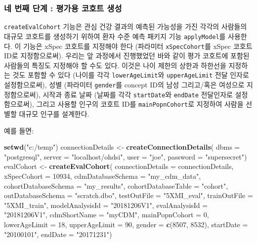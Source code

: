 \documentclass[10.5pt]{book}
\newenvironment{Shaded}{\begin{snugshade}}{\end{snugshade}}
\newcommand{\KeywordTok}[1]{\textcolor[rgb]{0.13,0.29,0.53}{\textbf{#1}}}
\newcommand{\DataTypeTok}[1]{\textcolor[rgb]{0.13,0.29,0.53}{#1}}
\newcommand{\DecValTok}[1]{\textcolor[rgb]{0.00,0.00,0.81}{#1}}
\newcommand{\StringTok}[1]{\textcolor[rgb]{0.31,0.60,0.02}{#1}}
\newcommand{\NormalTok}[1]{#1}
\theoremstyle{definition}
\theoremstyle{definition}
\theoremstyle{definition}
\theoremstyle{remark}
\begin{document}
\subsubsection*{네 번째 단계 : 평가용 코호트 생성}\label{-----}

\texttt{createEvalCohort} 기능은 관심 건강 결과의 예측된 가능성을 가진
각각의 사람들의 대규모 코호트를 생성하기 위하여 환자 수준 예측 패키지
기능 \texttt{applyModel}를 사용한다. 이 기능은 xSpec 코호트를 지정해야
한다 (파라미터 \texttt{xSpecCohort}를 xSpec 코호트 ID로 지정함으로써).
우리는 앞 과정에서 진행했었던 바와 같이 평가 코호트에 포함된 사람들의
특징도 지정해야 할 수도 있다. 이것은 나이 제한의 상한과 하한선을
지정하는 것도 포함할 수 있다 (나이를 각각 \texttt{lowerAgeLimit}와
\texttt{upperAgeLimit} 전달 인자로 설정함으로써), 성별 (파라미터
\texttt{gender}를 concept ID의 남성 그리고/혹은 여성으로 지정함으로써),
시작과 종료 날짜 (날짜를 각각 \texttt{startDate}와 \texttt{endDate}
전달인자로 설정함으로써), 그리고 사용할 인구의 코호트 ID를
\texttt{mainPopnCohort}로 지정하여 사람을 선별할 대규모 인구를 설계한다.

예를 들면:

\begin{Shaded}
\begin{Highlighting}[]
\KeywordTok{setwd}\NormalTok{(}\StringTok{"c:/temp"}\NormalTok{)}
\NormalTok{connectionDetails <-}\StringTok{ }\KeywordTok{createConnectionDetails}\NormalTok{(}
  \DataTypeTok{dbms =} \StringTok{"postgresql"}\NormalTok{,}
  \DataTypeTok{server =} \StringTok{"localhost/ohdsi"}\NormalTok{,}
  \DataTypeTok{user =} \StringTok{"joe"}\NormalTok{,}
  \DataTypeTok{password =} \StringTok{"supersecret"}\NormalTok{)}
\NormalTok{evalCohort <-}\StringTok{ }\KeywordTok{createEvalCohort}\NormalTok{(}
  \DataTypeTok{connectionDetails =}\NormalTok{ connectionDetails,}
  \DataTypeTok{xSpecCohort =} \DecValTok{10934}\NormalTok{,}
  \DataTypeTok{cdmDatabaseSchema =} \StringTok{"my_cdm_data"}\NormalTok{,}
  \DataTypeTok{cohortDatabaseSchema =} \StringTok{"my_results"}\NormalTok{,}
  \DataTypeTok{cohortDatabaseTable =} \StringTok{"cohort"}\NormalTok{,}
  \DataTypeTok{outDatabaseSchema =} \StringTok{"scratch.dbo"}\NormalTok{,}
  \DataTypeTok{testOutFile =} \StringTok{"5XMI_eval"}\NormalTok{,}
  \DataTypeTok{trainOutFile =} \StringTok{"5XMI_train"}\NormalTok{,}
  \DataTypeTok{modelAnalysisId =} \StringTok{"20181206V1"}\NormalTok{,}
  \DataTypeTok{evalAnalysisId =} \StringTok{"20181206V1"}\NormalTok{,}
  \DataTypeTok{cdmShortName =} \StringTok{"myCDM"}\NormalTok{,}
  \DataTypeTok{mainPopnCohort =} \DecValTok{0}\NormalTok{,}
  \DataTypeTok{lowerAgeLimit =} \DecValTok{18}\NormalTok{,}
  \DataTypeTok{upperAgeLimit =} \DecValTok{90}\NormalTok{,}
  \DataTypeTok{gender =} \KeywordTok{c}\NormalTok{(}\DecValTok{8507}\NormalTok{, }\DecValTok{8532}\NormalTok{),}
  \DataTypeTok{startDate =} \StringTok{"20100101"}\NormalTok{,}
  \DataTypeTok{endDate =} \StringTok{"20171231"}\NormalTok{)}
\end{Highlighting}
\end{Shaded}
\end{document}
